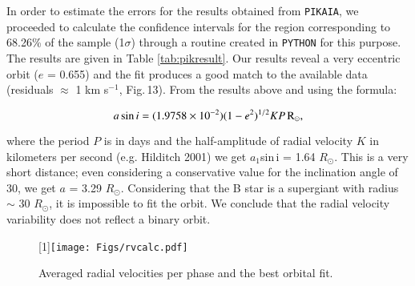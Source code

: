 \documentclass[useAMS,usenatbib]{mn2e}
\def\rsun{$R_{\odot}$}
\begin{document}

In order to estimate the errors for the results obtained from \texttt{PIKAIA}, we proceeded to calculate the confidence intervals for the region corresponding to 68.26\% of the sample (1$\sigma$) through a routine created in \texttt{PYTHON} for this purpose. The results are given in Table \ref{tab:pikresult}.
Our results reveal a very eccentric orbit ($e$ = 0.655) and the fit produces a good match to the  available data (residuals $\approx$ 1 km s$^{-1}$, Fig.\,13). From the results above and using the formula:

\begin{equation}
 a \sin i = (1.9758 \times 10^{-2}) (1 - e^2)^{1/2} K P\,  \rm{R_{\odot}}, 
\end{equation}

\noindent
where the period $P$ is in days and the half-amplitude of radial velocity $K$ in kilometers per second (e.g. Hilditch 2001) we get $a_1$sin\,i = 1.64 \rsun. This is a very short distance; even considering a conservative value for the inclination angle of 30, we get $a$ = 3.29 \rsun.
Considering that the B star is a supergiant with radius $\sim$ 30 \rsun, it is impossible to fit the orbit. We conclude that the radial velocity variability does not 
reflect a binary orbit.


\begin{figure}
\scalebox{1}[1]{\texttt{[image: Figs/rvcalc.pdf]}}
\caption{Averaged radial velocities per phase and the best orbital fit.}
  \label{x}
\end{figure}
\end{document}
